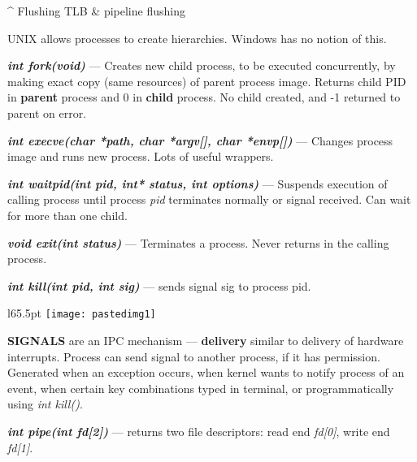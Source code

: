\^{} Flushing TLB \& pipeline flushing

\hSep

\textcolor{cornellred}{UNIX allows processes to create hierarchies.} 
\textcolor{ceruleanblue}{Windows has no notion of this.}

\textcolor{cornellred}{
\textit{\textbf{int fork(void)}} — Creates new child process, to be executed
concurrently, by making exact copy (same resources) of
parent process image. Returns child PID in \textbf{parent} process
and 0 in \textbf{child} process. No child created, and -1
returned to parent on error.}

\textcolor{cornellred}{
\textit{\textbf{int execve(char *path, char *argv[], char *envp[])}} — Changes process image and runs new
process. Lots of useful wrappers.}

\textcolor{cornellred}{
\textit{\textbf{int waitpid(int pid, int* status, int options)}} — Suspends execution of calling process
until process \textit{pid} terminates normally or signal received.
Can wait for more than one child.}


\textcolor{cornellred}{
\textit{\textbf{void exit(int status)}} — Terminates a process. Never returns in the
calling process.}

\textcolor{cornellred}{
\textit{\textbf{int kill(int pid, int sig)}} — sends signal sig to process pid.}

\hSep

\begin{wrapfigure}[9]{l}{65.5pt}
\vspace{-12pt}
\texttt{[image: pastedimg1]}
\end{wrapfigure}

\textcolor{cornellred}{\textbf{SIGNALS}} are an IPC mechanism — 
\textbf{delivery} similar
to delivery of hardware interrupts. Process can send signal to
another process, if it has permission. Generated when an
exception occurs, when kernel wants to notify process of
an event, when certain key combinations typed in terminal, 
or programmatically using \textcolor{cornellred}{\textit{int kill()}}.



\textcolor{cornellred}{\textit{\textbf{int pipe(int fd[2])}} — 
returns two file descriptors: 
read end \textit{fd[0]}, write end \textit{fd[1]}.}

\hSep
